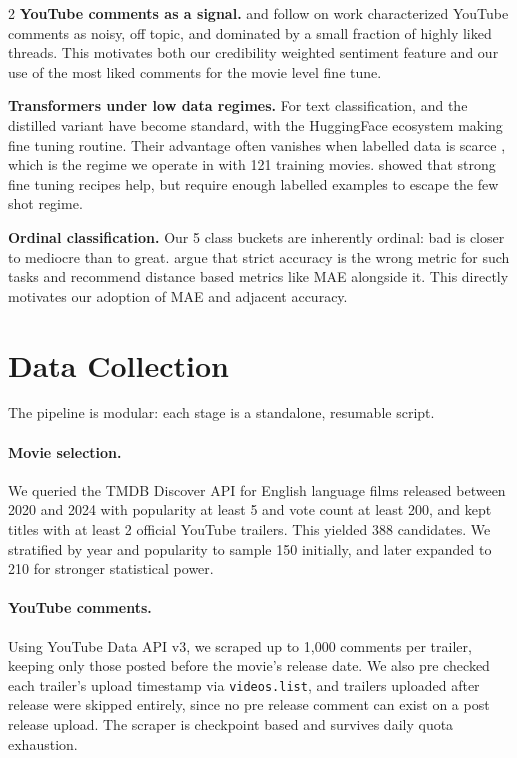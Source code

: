 \documentclass[10pt,letterpaper]{article}
\begin{document}
\begin{multicols}{2}
\textbf{YouTube comments as a signal.} \cite{schultes2013} and follow on work characterized YouTube comments as noisy, off topic, and dominated by a small fraction of highly liked threads. This motivates both our credibility weighted sentiment feature and our use of the most liked comments for the movie level fine tune.

\textbf{Transformers under low data regimes.} For text classification, \cite{devlin2019} and the distilled variant \cite{sanh2019} have become standard, with the HuggingFace ecosystem \cite{wolf2020} making fine tuning routine. Their advantage often vanishes when labelled data is scarce \cite{pang2002}, which is the regime we operate in with 121 training movies. \cite{howard2018} showed that strong fine tuning recipes help, but require enough labelled examples to escape the few shot regime.

\textbf{Ordinal classification.} Our 5 class buckets are inherently ordinal: bad is closer to mediocre than to great. \cite{baccianella2009} argue that strict accuracy is the wrong metric for such tasks and recommend distance based metrics like MAE alongside it. This directly motivates our adoption of MAE and adjacent accuracy.
\vspace{-10pt}
\section{Data Collection}
\noindent The pipeline is modular: each stage is a standalone, resumable script.

\paragraph{Movie selection.} We queried the TMDB Discover API for English language films released between 2020 and 2024 with popularity at least 5 and vote count at least 200, and kept titles with at least 2 official YouTube trailers. This yielded 388 candidates. We stratified by year and popularity to sample 150 initially, and later expanded to 210 for stronger statistical power.

\paragraph{YouTube comments.} Using YouTube Data API v3, we scraped up to 1,000 comments per trailer, keeping only those posted before the movie's release date. We also pre checked each trailer's upload timestamp via \texttt{videos.list}, and trailers uploaded after release were skipped entirely, since no pre release comment can exist on a post release upload. The scraper is checkpoint based and survives daily quota exhaustion.


\end{multicols}
\end{document}
